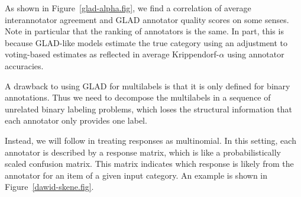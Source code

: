 \documentclass[11pt]{article}
\begin{document}
As shown in Figure~\ref{glad-alpha.fig}, we find a correlation of
average interannotator agreement and GLAD annotator quality scores on
some senses.  Note in particular that the ranking of annotators
is the same.  In part, this is because GLAD-like models estimate
the true category using an adjustment to voting-based estimates
as reflected in average Krippendorf-$\alpha$ using annotator
accuracies.

A drawback to using GLAD for multilabels is that it is only defined
for binary annotations.  Thus we need to decompose the multilabels
in a sequence of unrelated binary labeling problems, which loses
the structural information that each annotator only provides one
label.  

Instead, we will follow \cite{dawidSkene1979} in treating responses as
multinomial.  In this setting, each annotator is described by a
response matrix, which is like a probabilistically scaled confusion
matrix. This matrix indicates which response is likely from the
annotator for an item of a given input category.  An example is shown
in Figure~\ref{dawid-skene.fig}.
%





\cleardoublepage


\end{document}
